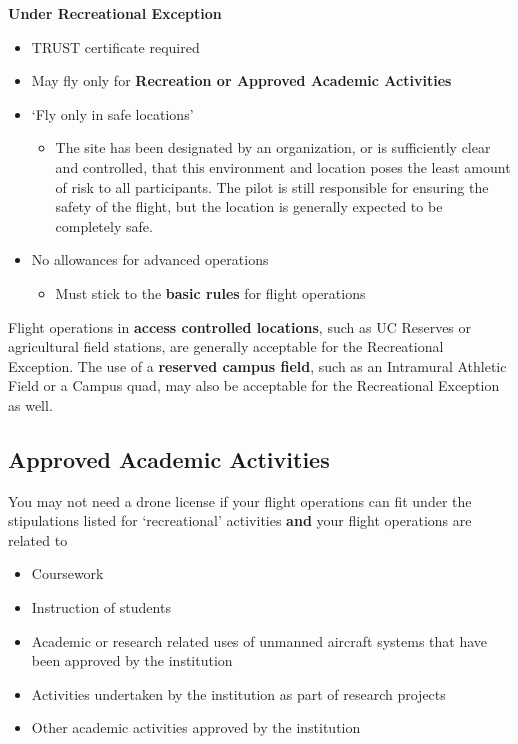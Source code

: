 \documentclass[
  12pt,
]{book}
\providecommand{\tightlist}{%
  \setlength{\itemsep}{0pt}\setlength{\parskip}{0pt}}
\begin{document}
\textbf{Under Recreational Exception}

\begin{itemize}
\tightlist
\item
  TRUST certificate required
\item
  May fly only for \textbf{Recreation or Approved Academic Activities}
\item
  `Fly only in safe locations'

  \begin{itemize}
  \tightlist
  \item
    The site has been designated by an organization, or is sufficiently clear and controlled, that this environment and location poses the least amount of risk to all participants. The pilot is still responsible for ensuring the safety of the flight, but the location is generally expected to be completely safe.
  \end{itemize}
\item
  No allowances for advanced operations

  \begin{itemize}
  \tightlist
  \item
    Must stick to the \textbf{basic rules} for flight operations
  \end{itemize}
\end{itemize}

Flight operations in \textbf{access controlled locations}, such as UC Reserves or agricultural field stations, are generally acceptable for the Recreational Exception. The use of a \textbf{reserved campus field}, such as an Intramural Athletic Field or a Campus quad, may also be acceptable for the Recreational Exception as well.

\hypertarget{approved-academic-activities}{%
\subsection{Approved Academic Activities}\label{approved-academic-activities}}

You may not need a drone license if your flight operations can fit under the stipulations listed for `recreational' activities \textbf{and} your flight operations are related to

\begin{itemize}
\tightlist
\item
  Coursework
\item
  Instruction of students
\item
  Academic or research related uses of unmanned aircraft systems that have been approved by the institution
\item
  Activities undertaken by the institution as part of research projects
\item
  Other academic activities approved by the institution
\end{itemize}
\end{document}
